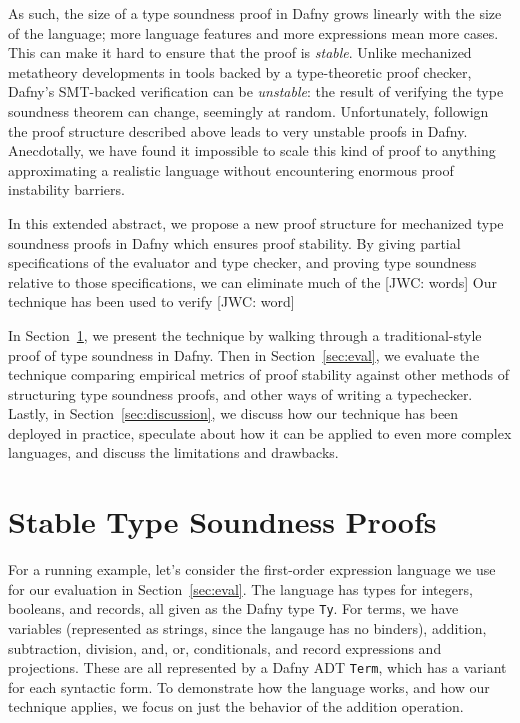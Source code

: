 \documentclass[sigplan,review,screen,anonymous]{acmart}
\newcommand{\comm}[3]{\textcolor{#1}{[#2: #3]}}
\newcommand{\jwc}[1]{\comm{dkgreen}{JWC}{#1}}
\begin{document}
As such, the size of a type soundness proof in Dafny grows linearly with the
size of the language; more language features and more expressions mean more
cases.  This can make it hard to ensure that the proof is \emph{stable}.  Unlike
mechanized metatheory developments in tools backed by a type-theoretic proof
checker, Dafny's SMT-backed verification can be \emph{unstable}: the result of
verifying the type soundness theorem can change, seemingly at random.
Unfortunately, followign the proof structure described above leads to very unstable proofs in Dafny. Anecdotally, we have
found it impossible to scale this kind of proof to anything approximating a realistic language without encountering enormous
proof instability barriers.

In this extended abstract, we propose a new proof structure for mechanized type soundness proofs in Dafny which ensures proof stability.
By giving partial specifications of the evaluator and type checker, and proving type soundness relative to those specifications, we
can eliminate much of the \jwc{words}
Our technique has been used to verify \jwc{word}

In Section~\ref{sec:sts}, we present the technique by walking through a traditional-style proof of type soundness in Dafny.
Then in Section~\ref{sec:eval}, we evaluate the technique comparing empirical metrics of proof stability against other methods of structuring type soundness proofs, and other ways of writing a typechecker.
Lastly, in Section~\ref{sec:discussion}, we discuss how our technique has been deployed in practice, speculate about how it can be applied to even more complex languages,
and discuss the limitations and drawbacks.


\section{Stable Type Soundness Proofs}
\label{sec:sts}
For a running example, let's consider the first-order expression language we
use for our evaluation in Section~\ref{sec:eval}.  The language has
types for integers, booleans, and records, all given as the Dafny type
\texttt{Ty}.  For terms, we have variables (represented as strings, since the
langauge has no binders), addition, subtraction, division, and, or,
conditionals, and record expressions and projections. These are all represented
by a Dafny ADT \texttt{Term}, which has a variant for each syntactic form.
To demonstrate how the language works, and how our technique applies, we focus
on just the behavior of the addition operation.
\end{document}
